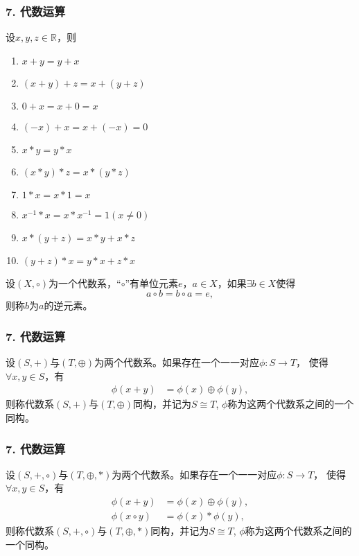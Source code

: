 \documentclass{beamer}
\begin{document}
\begin{CJK*}{UTF8}{gbsn}
\begin{frame}
  \frametitle{7. 代数运算}
  \begin{minipage}[t]{0.49\linewidth}
  \begin{block}{}
    设$x, y, z \in \mathbb{R}$，则
   \begin{enumerate}
   \item   $x + y = y + x$
   \item   $(x + y) + z = x + (y + z)$
   \item   $0 + x = x + 0 = x$
   \item   $(-x) + x = x + (-x) = 0$
   \item   $x * y = y * x$
   \item   $(x * y) * z = x * (y *z)$
   \item   $1 * x = x * 1 = x$
   \item   $x^{-1} * x = x * x^{-1} = 1(x\neq 0)$
   \item   $x* (y + z) = x * y + x * z$
   \item   $(y + z) * x = y * x + z * x$
    \end{enumerate}
  \end{block}\pause
\end{minipage}
\begin{minipage}[t]{0.49\linewidth}
  \begin{Def}
    设$(X, \circ)$为一个代数系，“$\circ$”有单位元素$e$，$a\in X$，如果$\exists b\in X$使得\[a\circ b = b \circ a = e,\]  则称$b$为$a$的\alert{逆元素}。
  \end{Def}
\end{minipage}
\end{frame}

\begin{frame}
  \frametitle{7. 代数运算}
  \begin{Def}
    设$(S,+)$与$(T, \oplus)$为两个代数系。如果存在一个一一对应$\phi:S\to T$， 使得$\forall x, y \in S$，有
    \begin{align*}
      \phi(x+y) &= \phi(x) \oplus \phi(y),
    \end{align*}
    则称代数系$(S,+)$与$(T, \oplus)$\alert{同构}，并记为$S\cong T$, $\phi$称为这两个代数系之间的一个同构。
  \end{Def}
\end{frame}

\begin{frame}
  \frametitle{7. 代数运算}
  \begin{Def}
    设$(S,+, \circ)$与$(T, \oplus, *)$为两个代数系。如果存在一个一一对应$\phi:S\to T$， 使得$\forall x, y \in S$，有
    \begin{align*}
      \phi(x+y) &= \phi(x) \oplus \phi(y),\\
      \phi(x\circ y)&= \phi(x) * \phi(y),
    \end{align*}
    则称代数系$(S,+,\circ)$与$(T, \oplus, *)$\alert{同构}，并记为$S\cong T$, $\phi$称为这两个代数系之间的一个同构。
  \end{Def}
\end{frame}


\end{CJK*}
\end{document}
